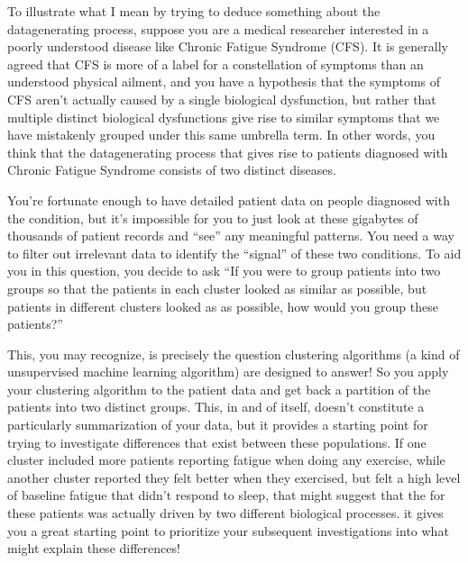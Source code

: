 \documentclass[letterpaper,10pt,english]{jupyterBook}
\begin{document}
\sphinxAtStartPar
To illustrate what I mean by trying to deduce something about the data\sphinxhyphen{}generating process, suppose you are a medical researcher interested in a poorly understood disease like Chronic Fatigue Syndrome (CFS). It is generally agreed that CFS is more of a label for a constellation of symptoms than an understood physical ailment, and you have a hypothesis that the symptoms of CFS aren’t actually caused by a single biological dysfunction, but rather that multiple distinct biological dysfunctions give rise to similar symptoms that we have mistakenly grouped under this same umbrella term. In other words, you think that the data\sphinxhyphen{}generating process that gives rise to patients diagnosed with Chronic Fatigue Syndrome consists of two distinct diseases.

\sphinxAtStartPar
You’re fortunate enough to have detailed patient data on people diagnosed with the condition, but it’s impossible for you to just look at these gigabytes of thousands of patient records and “see” any meaningful patterns. You need a way to filter out irrelevant data to identify the “signal” of these two conditions. To aid you in this question, you decide to ask “If you were to group patients into two groups so that the patients in each cluster looked as similar as possible, but patients in different clusters looked as  as possible, how would you group these patients?”

\sphinxAtStartPar
This, you may recognize, is precisely the question clustering algorithms (a kind of unsupervised machine learning algorithm) are designed to answer! So you apply your clustering algorithm to the patient data and get back a partition of the patients into two distinct groups. This, in and of itself, doesn’t constitute a particularly  summarization of your data, but it provides a starting point for trying to investigate  differences that exist between these populations. If one cluster included more patients reporting fatigue when doing any exercise, while another cluster reported they felt better when they exercised, but felt a high level of baseline fatigue that didn’t respond to sleep, that might suggest that the  for these patients was actually driven by two different biological processes.  it gives you a great starting point to prioritize your subsequent investigations into what might explain these differences!
\end{document}

